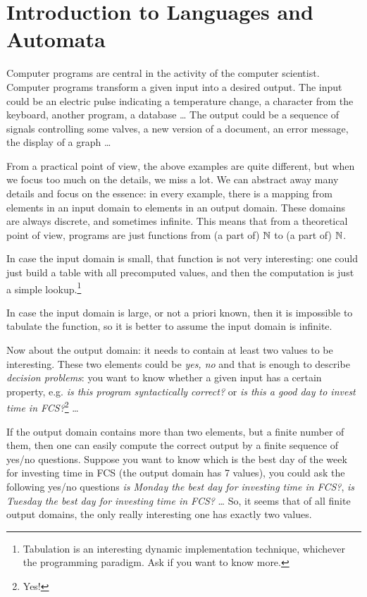 \chapter{Introduction to Languages and Automata}\label{chap:languagesautomaten}

Computer programs are central in the activity of the computer
scientist. Computer programs transform a given input into a desired
output. The input could be an electric pulse indicating a temperature
change, a character from the keyboard, another program, a database
\ldots{} The output could be a sequence of signals controlling some valves,
a new version of a document, an error message, the display of a
graph \ldots

From a practical point of view, the above examples are quite
different, but when we focus too much on the details, we miss a lot.
We can abstract away many details and focus on the essence: in every
example, there is a mapping from elements in an input domain to
elements in an output domain. These domains are always discrete, and
sometimes infinite. This means that from a theoretical point of view,
programs are just functions from (a part of) $\mathbb{N}$ to (a part of) $\mathbb{N}$.

In case the input domain is small, that function is not very
interesting: one could just build a table with all precomputed values,
and then the computation is just a simple lookup.\footnote{Tabulation
is an interesting dynamic implementation technique, whichever the
programming paradigm. Ask if you want to know more.}

In case the input domain is large, or not a priori known, then it is
impossible to tabulate the function, so it is better to assume the
input domain is infinite.

Now about the output domain: it needs to contain at least two values
to be interesting. These two elements could be {\em yes, no} and that
is enough to describe {\em decision problems}: you want to know
whether a given input has a certain property, e.g. {\em is this
program syntactically correct?} or {\em is this a good day to invest
time in FCS?}\footnote{Yes!} \ldots

If the output domain contains more than two elements, but a finite
number of them, then one can easily compute the correct output by a
finite sequence of yes/no questions. Suppose you want to know which is
the best day of the week for investing time in FCS (the output domain
has 7 values), you could ask the following yes/no questions {\em is
Monday the best day for investing time in FCS?}, {\em is Tuesday the
best day for investing time in FCS?} \ldots{} So, it seems that of all
finite output domains, the only really interesting one has exactly two
values.

